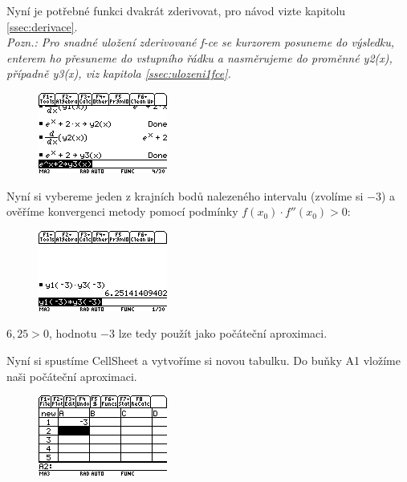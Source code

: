 \documentclass[10pt,a4paper,float]{article}
\begin{document}
Nyní je potřebné funkci dvakrát zderivovat, pro návod vizte kapitolu \ref{ssec:derivace}.\\
\textit{Pozn.: Pro snadné uložení zderivované f-ce se kurzorem posuneme do výsledku, enterem ho přesuneme do vstupního řádku a nasměrujeme do proměnné y2(x), případně y3(x), viz kapitola \ref{ssec:ulozeni1fce}.}

\begin{figure}[H]
	\centering
	\includegraphics[width=.5\textwidth]{img/1NEWTON3.PNG}
\end{figure}

Nyní si vybereme jeden z krajních bodů nalezeného intervalu (zvolíme si $-3$) a ověříme konvergenci metody pomocí podmínky $f(x_0) \cdot f''(x_0) > 0$:

\begin{figure}[H]
	\centering
	\includegraphics[width=.5\textwidth]{img/1NEWTON4.PNG}
\end{figure}

$6,25 > 0$, hodnotu $-3$ lze tedy použít jako počáteční aproximaci.

\pagebreak

Nyní si spustíme CellSheet a vytvoříme si novou tabulku. Do buňky A1 vložíme naši počáteční aproximaci.

\begin{figure}[H]
	\centering
	\includegraphics[width=.5\textwidth]{img/1NEWTON5.PNG}
\end{figure}
\end{document}
